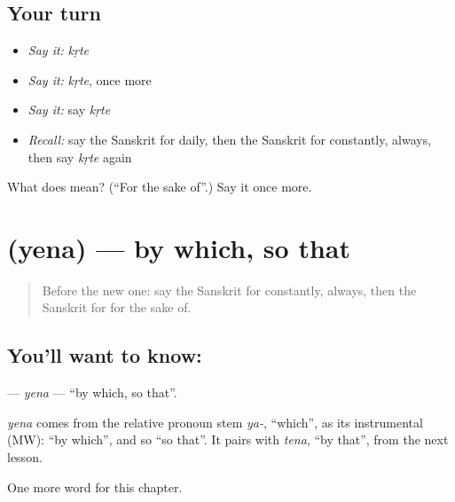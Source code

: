 \subsection*{Your turn}
\begin{itemize}
\raggedright
  \item \emph{Say it:} \emph{kṛte}
  \item \emph{Say it:} \emph{kṛte}, once more
  \item \emph{Say it:} say \emph{kṛte}
  \item \emph{Recall:} say the Sanskrit for daily, then the Sanskrit for constantly, always, then say \emph{kṛte} again
\end{itemize}

\begin{tcolorbox}[breakable,colback=teal!4,colframe=teal!35!black,title={Before you move on}]
What does  mean? (\textquotedblleft{}For the sake of\textquotedblright{}.) Say it once more.
\end{tcolorbox}
\section[\texorpdfstring{\sk{येन} (yena)}{येन (yena)}]{ (yena) — by which, so that}

\label{lesson:SA-C241-yena}



\begin{quote}
Before the new one: say the Sanskrit for constantly, always, then the Sanskrit for for the sake of.
\end{quote}

\subsection*{You'll want to know: }
\textbf{} — \emph{yena} — \textquotedblleft{}by which, so that\textquotedblright{}.

\begin{cousinweb}
\emph{yena} comes from the relative pronoun stem \emph{ya-}, \textquotedblleft{}which\textquotedblright{}, as its instrumental (MW): \textquotedblleft{}by which\textquotedblright{}, and so \textquotedblleft{}so that\textquotedblright{}. It pairs with \emph{tena}, \textquotedblleft{}by that\textquotedblright{}, from the next lesson.
\end{cousinweb}

\begin{grammarlens}[title={What you've built}]
One more word for this chapter.
\end{grammarlens}

